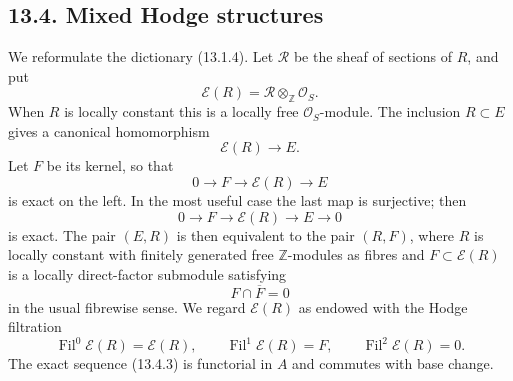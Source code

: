 \documentclass[11pt]{article}
\providecommand{\cO}{\mathcal O}
\providecommand{\Z}{\mathbb Z}
\providecommand{\Fil}{\operatorname{Fil}}
\providecommand{\cE}{\mathcal E}
\providecommand{\cR}{\mathcal R}
\begin{document}
\subsection*{13.4. Mixed Hodge structures}

We reformulate the dictionary (13.1.4).  Let \(\cR\) be the sheaf of sections of \(R\), and put
\begin{equation}\tag{13.4.1}
        \cE(R)=\cR\otimes_\Z\cO_S.
\end{equation}
When \(R\) is locally constant this is a locally free \(\cO_S\)-module.  The inclusion \(R\subset E\) gives a canonical homomorphism
\begin{equation}\tag{13.4.2}
        \cE(R)\longrightarrow E.
\end{equation}
Let \(F\) be its kernel, so that
\begin{equation}\tag{13.4.3}
        0\longrightarrow F\longrightarrow \cE(R)\longrightarrow E
\end{equation}
is exact on the left.  In the most useful case the last map is surjective; then
\begin{equation}\tag{13.4.4}
        0\longrightarrow F\longrightarrow \cE(R)\longrightarrow E\longrightarrow0
\end{equation}
is exact.  The pair \((E,R)\) is then equivalent to the pair \((R,F)\), where \(R\) is locally constant with finitely generated free \(\Z\)-modules as fibres and \(F\subset \cE(R)\) is a locally direct-factor submodule satisfying
\begin{equation}\tag{13.4.5}
        F\cap\overline F=0
\end{equation}
in the usual fibrewise sense.  We regard \(\cE(R)\) as endowed with the Hodge filtration
\begin{equation}\tag{13.4.6}
        \Fil^0\cE(R)=\cE(R),\qquad
        \Fil^1\cE(R)=F,\qquad
        \Fil^2\cE(R)=0.
\end{equation}
The exact sequence (13.4.3) is functorial in \(A\) and commutes with base change.
\end{document}
